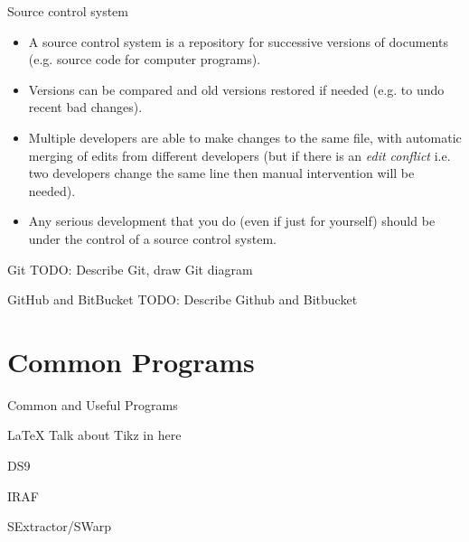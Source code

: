 \documentclass{beamer}
\begin{document}
\begin{frame}{Source control system}

  \begin{itemize}
    \item A source control system is a repository for successive versions of documents (e.g. source code for computer programs).
    \item Versions can be compared and old versions restored if needed (e.g. to undo recent bad changes).
    \item Multiple developers are able to make changes to the same file, with automatic merging of edits from different developers (but if there is an \textit{edit conflict} i.e. two developers change the same line then manual intervention will be needed).
    \item Any serious development that you do (even if just for yourself) should be under the control of a source control system.
  \end{itemize}
\end{frame}
    
\begin{frame}{Git}    
  TODO: Describe Git, draw Git diagram
\end{frame}


\begin{frame}{GitHub and BitBucket}    
  TODO: Describe Github and Bitbucket
\end{frame}




\section{Common Programs}
\begin{frame}{Common and Useful Programs}
  \begin{block}{LaTeX}
    Talk about Tikz in here
  \end{block}
  \begin{block}{DS9}
  \end{block}
  \begin{block}{IRAF}
  \end{block}
  \begin{block}{SExtractor/SWarp}
  \end{block}
\end{frame}
\end{document}
